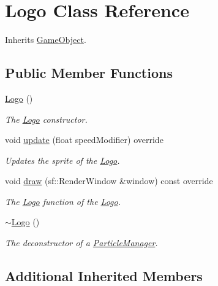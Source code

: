 \hypertarget{class_logo}{\section{Logo Class Reference}
\label{class_logo}
}


Inherits \hyperlink{class_game_object}{Game\+Object}.

\subsection*{Public Member Functions}
\begin{DoxyCompactItemize}
\item 
\hyperlink{class_logo_a9d2597f741dbf6721950dfe3a57a3f59}{Logo} ()
\begin{DoxyCompactList}\small\item\em The \hyperlink{class_logo}{Logo} constructor. \end{DoxyCompactList}\item 
void \hyperlink{class_logo_a3c7f6eb9479e2594652d2a2f60c77e21}{update} (float speed\+Modifier) override
\begin{DoxyCompactList}\small\item\em Updates the sprite of the \hyperlink{class_logo}{Logo}. \end{DoxyCompactList}\item 
void \hyperlink{class_logo_a11888dba8385829c49384acbd488d339}{draw} (sf\+::\+Render\+Window \&window) const override
\begin{DoxyCompactList}\small\item\em The \hyperlink{class_logo}{Logo} function of the \hyperlink{class_logo}{Logo}. \end{DoxyCompactList}\item 
\hypertarget{class_logo_a16149bd55a57a52f38fe63ddeb5e1e1e}{\hyperlink{class_logo_a16149bd55a57a52f38fe63ddeb5e1e1e}{$\sim$\+Logo} ()}\label{class_logo_a16149bd55a57a52f38fe63ddeb5e1e1e}

\begin{DoxyCompactList}\small\item\em The deconstructor of a \hyperlink{class_particle_manager}{Particle\+Manager}. \end{DoxyCompactList}\end{DoxyCompactItemize}
\subsection*{Additional Inherited Members}


